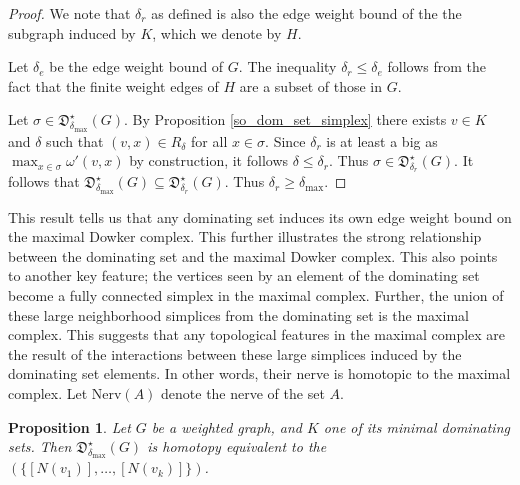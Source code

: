 \documentclass[pdflatex,bst/sn-mathphys-num]{sn-jnl}%
\theoremstyle{thmstyleone}%
\newtheorem{prop}[theorem]{Proposition}%
\theoremstyle{definition}
\theoremstyle{thmstyletwo}%
\newcommand{\FD}{\mathfrak{D}}
\theoremstyle{thmstylethree}%
\begin{document}
\begin{proof}
    We note that $\delta_r$ as defined is also the edge weight bound of the the subgraph induced by $K$, which we denote by $H$.
    
    Let $\delta_e$ be the edge weight bound of $G$. The inequality $\delta_r\leq \delta_e$ follows from the fact that the finite weight edges of $H$ are a subset of those in $G$.

    Let $\sigma\in \FD^\star_{\delta_\text{max}}(G)$. By Proposition \ref{so_dom_set_simplex} there exists $v\in K$ and $\delta$ such that $(v,x)\in R_\delta$ for all $x\in \sigma$. Since $\delta_r$ is at least a big as $\max_{x\in \sigma} \omega'(v,x)$ by construction, it follows $\delta\leq \delta_r$. Thus $\sigma\in \FD^\star_{\delta_r}(G)$. It follows that $\FD^\star_{\delta_\text{max}}(G) \subseteq \FD^\star_{\delta_r}(G)$. Thus $\delta_r\geq \delta_{\text{max}}$.
\end{proof}

This result tells us that any dominating set induces its own edge weight bound on the maximal Dowker complex. This further illustrates the strong relationship between the dominating set and the maximal Dowker complex. This also points to another key feature; the vertices seen by an element of the dominating set become a fully connected simplex in the maximal complex. Further, the union of these large neighborhood simplices from the dominating set is the maximal complex. This suggests that any topological features in the maximal complex are the result of the interactions between these large simplices induced by the dominating set elements. In other words, their nerve is homotopic to the maximal complex. Let Nerv$(A)$ denote the nerve of the set $A$.



\begin{prop}\label{prop:dominantnerve}
    Let $G$ be a weighted graph, and $K$ one of its minimal dominating sets. Then $\FD^\star_{\delta_\text{max}}(G)$ is homotopy equivalent to the $\left(\{[N(v_1)], \dotsc , [N(v_k)]\}\right)$.
\end{prop}
\end{document}
